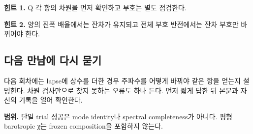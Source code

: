 \documentclass[
  10pt,
  a4paper,
]{article}
\begin{document}
\textbf{힌트 1.} Q 각 항의 차원을 먼저 확인하고 부호는 별도 점검한다.

\textbf{힌트 2.} 양의 진폭 배율에서는 잔차가 유지되고 전체 부호
반전에서는 잔차 부호만 바뀌어야 한다.

\subsection{다음 만남에 다시
묻기}\label{uxb2e4uxc74c-uxb9ccuxb0a8uxc5d0-uxb2e4uxc2dc-uxbb3buxae30}

다음 회차에는 lapse에 상수를 더한 경우 주파수를 어떻게 바꿔야 같은 항을
얻는지 설명한다. 차원 검사만으로 찾지 못하는 오류도 하나 든다. 먼저 짧게
답한 뒤 본문과 자신의 기록을 열어 확인한다.

\textbf{범위.} 단일 trial 성공은 mode identity나 spectral completeness가
아니다. 평형 barotropic χ는 frozen composition을 포함하지 않는다.
\end{document}

